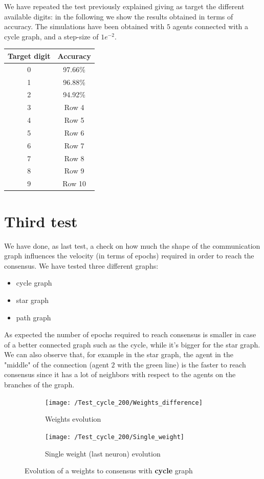 \documentclass[a4paper,11pt,oneside]{book}
\begin{document}
We have repeated the test previously explained giving as target the different available digits: in the following we show the results obtained in terms of accuracy.
The simulations have been obtained with $5$ agents connected with a cycle graph, and a step-size of $1e^{-2}$.

\begin{center}
\begin{tabular}{|c|c|}
\hline
Target digit & Accuracy \\
\hline
0 & 97.66\% \\
1 & 96.88\% \\
2 & 94.92\% \\
3 & Row 4 \\
4 & Row 5 \\
5 & Row 6 \\
6 & Row 7 \\
7 & Row 8 \\
8 & Row 9 \\
9 & Row 10 \\
\hline
\end{tabular}
\end{center}

\section{Third test}
We have done, as last test, a check on how much the shape of the communication graph influences the velocity (in terms of epochs) required in order to reach the consensus.
We have tested three different graphs:
\begin{itemize}
\item cycle graph
\item star graph
\item path graph
\end{itemize}

As expected the number of epochs required to reach consensus is smaller in case of a better connected graph such as the cycle, while it's bigger for the star graph.
We can also observe that, for example in the star graph, the agent in the "middle" of the connection (agent $2$ with the green line) is the faster to reach consensus since it has a lot of neighbors with respect to the agents on the branches of the graph.

\begin{figure}[h]
\centering
	\begin{subfigure}{0.49\textwidth}	
	\texttt{[image: /Test\_cycle\_200/Weights\_difference]}
	\caption{Weights evolution}
	\end{subfigure}
\hfill
	\begin{subfigure}{0.49\textwidth}	
	\texttt{[image: /Test\_cycle\_200/Single\_weight]}
	\caption{Single weight (last neuron) evolution}
	\end{subfigure}
\caption{Evolution of a weights to consensus with \textbf{cycle} graph}
\label{cycle_test}
\end{figure}
\end{document}
